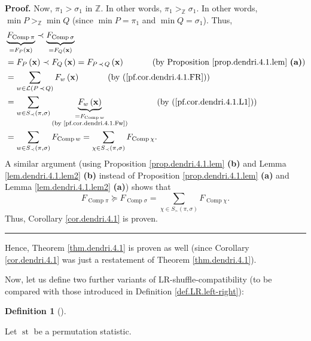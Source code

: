 \documentclass[numbers=enddot,12pt,final,onecolumn,notitlepage]{scrartcl}%
\theoremstyle{definition}
\newtheorem{defi}[theo]{Definition}
\newenvironment{definition}[1][]
{\begin{defi}[#1]\begin{leftbar}}
{\end{leftbar}\end{defi}}
\newenvironment{proof}[1][Proof]{\noindent\textbf{#1.} }{\ \rule{0.5em}{0.5em}}
\newenvironment{verlong}{}{}
\let\sumnonlimits\sum
\renewcommand{\sum}{\sumnonlimits\limits}
\begin{document}
\begin{verlong}
\begin{proof}
Now, $\pi_{1}>\sigma_{1}$ in $\mathbb{Z}$. In other words, $\pi_{1}%
>_{\mathbb{Z}}\sigma_{1}$. In other words, $\min P>_{\mathbb{Z}}\min Q$ (since
$\min P=\pi_{1}$ and $\min Q=\sigma_{1}$). Thus,
\begin{align*}
& \underbrace{F_{\operatorname*{Comp}\pi}}_{=F_{P}\left(  \mathbf{x}\right)
}\left.  \prec\right.  \underbrace{F_{\operatorname*{Comp}\sigma}}%
_{=F_{Q}\left(  \mathbf{x}\right)  }\\
& =F_{P}\left(  \mathbf{x}\right)  \left.  \prec\right.  F_{Q}\left(
\mathbf{x}\right)  =F_{P\left.  \prec\right.  Q}\left(  \mathbf{x}\right)
\ \ \ \ \ \ \ \ \ \ \left(  \text{by Proposition \ref{prop.dendri.4.1.lem}
\textbf{(a)}}\right)  \\
& =\sum_{w\in\mathcal{L}\left(  P\left.  \prec\right.  Q\right)  }F_{w}\left(
\mathbf{x}\right)  \ \ \ \ \ \ \ \ \ \ \left(  \text{by
(\ref{pf.cor.dendri.4.1.FR})}\right)  \\
& =\sum_{w\in S_{\prec}\left(  \pi,\sigma\right)  }\underbrace{F_{w}\left(
\mathbf{x}\right)  }_{\substack{=F_{\operatorname*{Comp}w}\\\text{(by
\eqref{pf.cor.dendri.4.1.Fw})}}}\ \ \ \ \ \ \ \ \ \ \left(  \text{by
(\ref{pf.cor.dendri.4.1.L1})}\right)  \\
& =\sum_{w\in S_{\prec}\left(  \pi,\sigma\right)  }F_{\operatorname*{Comp}%
w}=\sum_{\chi\in S_{\prec}\left(  \pi,\sigma\right)  }F_{\operatorname*{Comp}%
\chi}.
\end{align*}
A similar argument (using Proposition \ref{prop.dendri.4.1.lem} \textbf{(b)}
and Lemma \ref{lem.dendri.4.1.lem2} \textbf{(b)} instead of Proposition
\ref{prop.dendri.4.1.lem} \textbf{(a)} and Lemma \ref{lem.dendri.4.1.lem2}
\textbf{(a)}) shows that%
\[
F_{\operatorname*{Comp}\pi}\left.  \succeq\right.  F_{\operatorname*{Comp}%
\sigma}=\sum_{\chi\in S_{\succ}\left(  \pi,\sigma\right)  }%
F_{\operatorname*{Comp}\chi}.
\]
Thus, Corollary \ref{cor.dendri.4.1} is proven.
\end{proof}

Hence, Theorem \ref{thm.dendri.4.1} is proven as well (since Corollary
\ref{cor.dendri.4.1} was just a restatement of Theorem \ref{thm.dendri.4.1}).

Now, let us define two further variants of LR-shuffle-compatibility (to be
compared with those introduced in Definition \ref{def.LR.left-right}):

\begin{definition}
Let $\operatorname*{st}$ be a permutation statistic.


\end{definition}
\end{verlong}
\end{document}
